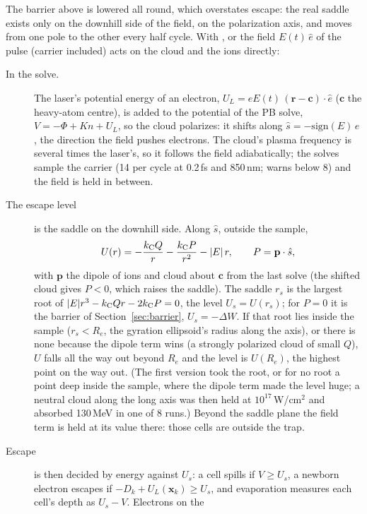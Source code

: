 The barrier above is lowered all round, which overstates escape: the real saddle exists only on the downhill side of
the field, on the polarization axis, and moves from one pole to the other every half cycle.
With ,  or  the field $E(t)\,\hat e$ of the pulse (carrier included)
acts on the cloud and the ions directly:
\begin{description}
  \item[In the solve.] The laser's potential energy of an electron, $U_L = eE(t)\,(\mathbf r-\mathbf c)\cdot\hat e$
    ($\mathbf c$ the heavy-atom centre), is added to the potential of the PB solve, $V = -\Phi + Kn + U_L$, so the cloud
    polarizes: it shifts along $\hat s = -\mathrm{sign}(E)\,\hat e$, the direction the field pushes electrons.
    The cloud's plasma frequency is several times the laser's, so it follows the field adiabatically; the solves sample
    the carrier (14 per cycle at 0.2\,fs and 850\,nm;  warns below 8) and the field is held in between.
  \item[The escape level] is the saddle on the downhill side. Along $\hat s$, outside the sample,
    \begin{equation}
      U(r) = -\frac{k_{\mathrm C} Q}{r} - \frac{k_{\mathrm C} P}{r^2} - |E|\,r,\qquad P = \mathbf p\cdot\hat s,
    \end{equation}
    with $\mathbf p$ the dipole of ions and cloud about $\mathbf c$ from the last solve (the shifted cloud gives $P<0$,
    which raises the saddle). The saddle $r_s$ is the largest root of $|E|r^3-k_{\mathrm C} Qr-2k_{\mathrm C} P=0$, the level
    $U_s = U(r_s)$; for $P=0$ it is the barrier of Section~\ref{sec:barrier}, $U_s=-\Delta W$.
    If that root lies inside the sample ($r_s<R_e$, the gyration ellipsoid's radius along the axis), or there is
    none because the dipole term wins (a strongly polarized cloud of small $Q$), $U$ falls all the way out beyond
    $R_e$ and the level is $U(R_e)$, the highest point on the way out. (The first version took the root, or for no
    root a point deep inside the sample, where the dipole term made the level huge; a neutral cloud along the long
    axis was then held at $10^{17}$\,W/cm$^2$ and absorbed 130\,MeV in one of 8 runs.) Beyond the saddle plane
    the field term is held at its value there: those cells are outside the trap.
  \item[Escape] is then decided by energy against $U_s$: a cell spills if $V\ge U_s$, a newborn electron escapes if
    $-D_k + U_L(\mathbf x_k)\ge U_s$, and evaporation measures each cell's depth as $U_s - V$. Electrons on the

\end{description}

